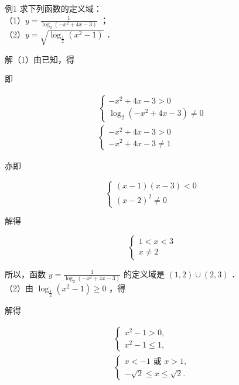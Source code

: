 \documentclass[10pt]{article}
\begin{document}
例1 求下列函数的定义域：\\
（1）\(y=\frac{1}{\log _{2}\left(-x^{2}+4 x-3\right)}\) ；\\
（2）\(y=\sqrt{\log _{\frac{1}{2}}\left(x^{2}-1\right)}\) ．

解（1）由已知，得

即

\[
\begin{gathered}
\left\{\begin{array}{l}
-x^{2}+4 x-3>0 \\
\log _{2}\left(-x^{2}+4 x-3\right) \neq 0
\end{array}\right. \\
\left\{\begin{array}{l}
-x^{2}+4 x-3>0 \\
-x^{2}+4 x-3 \neq 1
\end{array}\right.
\end{gathered}
\]

亦即

\[
\left\{\begin{array}{l}
(x-1)(x-3)<0 \\
(x-2)^{2} \neq 0
\end{array}\right.
\]

解得

\[
\left\{\begin{array}{l}
1<x<3 \\
x \neq 2
\end{array}\right.
\]

所以，函数 \(y=\frac{1}{\log _{2}\left(-x^{2}+4 x-3\right)}\) 的定义域是 \((1,2) \cup(2,3)\) ．\\
（2）由 \(\log _{\frac{1}{2}}\left(x^{2}-1\right) \geqslant 0\) ，得

解得

\[
\begin{gathered}
\left\{\begin{array}{l}
x^{2}-1>0, \\
x^{2}-1 \leqslant 1,
\end{array}\right. \\
\left\{\begin{array}{l}
x<-1 \text { 或 } x>1, \\
-\sqrt{2} \leqslant x \leqslant \sqrt{2} .
\end{array}\right.
\end{gathered}
\]
\end{document}
